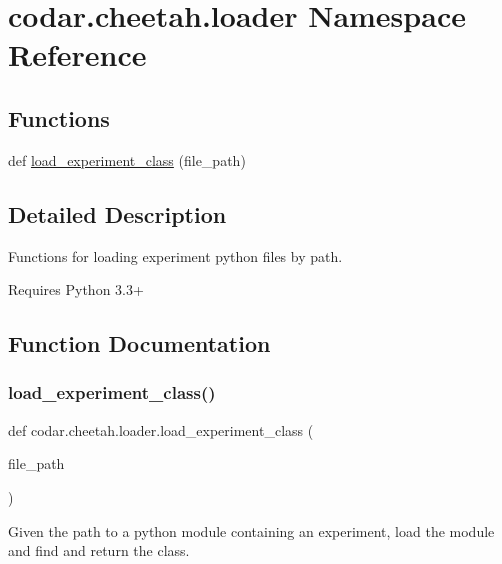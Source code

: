\hypertarget{namespacecodar_1_1cheetah_1_1loader}{}\section{codar.\+cheetah.\+loader Namespace Reference}
\label{namespacecodar_1_1cheetah_1_1loader}
\subsection*{Functions}
\begin{DoxyCompactItemize}
\item 
def \hyperlink{namespacecodar_1_1cheetah_1_1loader_a64a522fe5f533ce89a37763862fd1a85}{load\+\_\+experiment\+\_\+class} (file\+\_\+path)
\end{DoxyCompactItemize}


\subsection{Detailed Description}
\begin{DoxyVerb}Functions for loading experiment python files by path.

Requires Python 3.3+
\end{DoxyVerb}
 

\subsection{Function Documentation}
\mbox{\label{namespacecodar_1_1cheetah_1_1loader_a64a522fe5f533ce89a37763862fd1a85}} 
\subsubsection{\texorpdfstring{load\+\_\+experiment\+\_\+class()}{load\_experiment\_class()}}
{\footnotesize\ttfamily def codar.\+cheetah.\+loader.\+load\+\_\+experiment\+\_\+class (\begin{DoxyParamCaption}\item[{}]{file\+\_\+path }\end{DoxyParamCaption})}

\begin{DoxyVerb}Given the path to a python module containing an experiment, load the
module and find and return the class.\end{DoxyVerb}
 